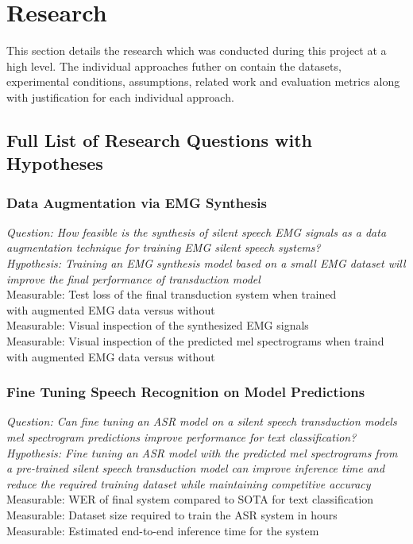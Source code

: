 \chapter{Research} \label{chap:research}

This section details the research which was conducted during this project
at a high level. The individual approaches futher on contain the datasets,
experimental conditions, assumptions, related work and evaluation metrics
along with justification for each individual approach.

\section{Full List of Research Questions with Hypotheses}

\subsection{Data Augmentation via EMG Synthesis}
\textit{Question: How feasible is the synthesis of silent speech EMG signals
as a data augmentation technique for training EMG silent speech systems?} \\
\textit{Hypothesis: Training an EMG synthesis model based on a small
EMG dataset will improve the final performance of transduction model} \\
Measurable: Test loss of the final transduction system when trained\\
with augmented EMG data versus without\\
Measurable: Visual inspection of the synthesized EMG signals\\
Measurable: Visual inspection of the predicted mel spectrograms when
traind with augmented EMG data versus without\\

\subsection{Fine Tuning Speech Recognition on Model Predictions }
\textit{Question: Can fine tuning an ASR model on a silent speech
transduction models mel spectrogram predictions improve performance for
text classification?} \\
\textit{Hypothesis: Fine tuning an ASR model with the predicted
mel spectrograms from a pre-trained silent speech transduction model
can improve inference time and reduce the required training dataset
while maintaining competitive accuracy} \\
Measurable: WER of final system compared to SOTA for text classification \\
Measurable: Dataset size required to train the ASR system in hours \\
Measurable: Estimated end-to-end inference time for the system